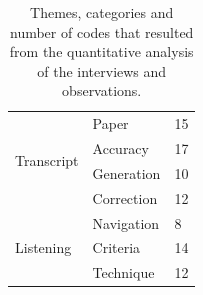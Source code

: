 \begin{table}[p]
{\begin{tabular}{l l l}
      \multirow{4}{*}{Transcript}
      & Paper & 15 \\ %
      & Accuracy & 17 \\ %
      & Generation & 10 \\ %
      & Correction & 12 \\ \hline %
      \multirow{3}{*}{Listening}
      & Navigation & 8 \\ %
      & Criteria & 14 \\ %
      & Technique & 12 \\ \hline %

    \end{tabular}
  }
  \caption{Themes, categories and number of codes that resulted from the quantitative analysis of the interviews and
  observations.}
  \label{tab:paper-codes}
\end{table}


